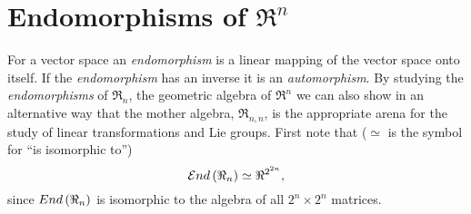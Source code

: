 \section{Endomorphisms of $\Re^{n}$}

For a vector space an \emph{endomorphism} is a linear mapping of the vector space onto itself. If the \emph{endomorphism} has an
inverse it is an \emph{automorphism}. By studying the \emph{endomorphisms} of $\Re_{n}$, the geometric algebra of $\Re^{n}$ we can
also show in an alternative way that the mother algebra, $\Re_{n,n}$, is the appropriate arena for the study of linear transformations
and Lie groups.  First note that ($\simeq$ is the symbol for ``is isomorphic to'')
\begin{equation}
	{\mathcal{E}nd}\left ( {\Re_{n}} \right ) \simeq \Re^{2^{2n}},
\end{equation}
since ${End}\left ( {\Re_{n}} \right )$ is isomorphic to the algebra of all $2^{n}\times 2^{n}$ matrices. 

